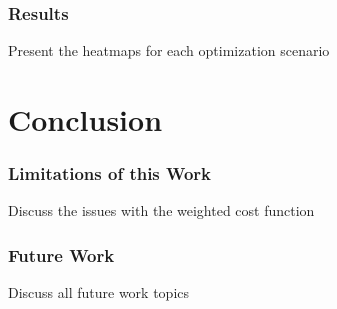 \documentclass[10pt, compress, xcolor={table,xcdraw}, aspectratio=169]{beamer}
\begin{document}
\begin{frame}
    \frametitle{Results}
    \begin{block}{Present the heatmaps for each optimization scenario}
    \end{block}
\end{frame}

\section{Conclusion}

\begin{frame}
    \frametitle{Limitations of this Work}
    \begin{block}{Discuss the issues with the weighted cost function}
    \end{block}
\end{frame}

\begin{frame}
    \frametitle{Future Work}
    \begin{block}{Discuss all future work topics}
    \end{block}
\end{frame}

\maketitle
\end{document}
